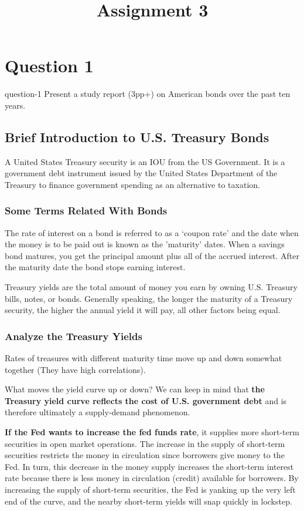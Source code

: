 \title{Assignment 3}


\section{Question 1}
\begin{statebox}{}{question-1}
    Present a study report (3pp+) on American bonds over the past ten years.
\end{statebox}
\subsection{Brief Introduction to U.S. Treasury Bonds}
A United States Treasury security is an IOU from the US Government. It is a government debt instrument issued by the United States Department of the Treasury to finance government spending as an alternative to taxation.
\subsubsection{Some Terms Related With Bonds}
The rate of interest on a bond is referred to as a `coupon rate' and the date when the money is to be paid out is known as the 'maturity' dates. When a savings bond matures, you get the principal amount plus all of the accrued interest. After the maturity date the bond stops earning interest.

Treasury yields are the total amount of money you earn by owning U.S. Treasury bills, notes, or bonds. Generally speaking, the longer the maturity of a Treasury security, the higher the annual yield it will pay, all other factors being equal.

\subsubsection{Analyze the Treasury Yields}
Rates of treasures with different maturity time move up and down somewhat together (They have high correlations).

What moves the yield curve up or down? We can keep in mind that \textbf{the Treasury yield curve reflects the cost of U.S. government debt} and is therefore ultimately a supply-demand phenomenon.

\textbf{If the Fed wants to increase the fed funds rate}, it supplies more short-term securities in open market operations. The increase in the supply of short-term securities restricts the money in circulation since borrowers give money to the Fed. In turn, this decrease in the money supply increases the short-term interest rate because there is less money in circulation (credit) available for borrowers. By increasing the supply of short-term securities, the Fed is yanking up the very left end of the curve, and the nearby short-term yields will snap quickly in lockstep.

